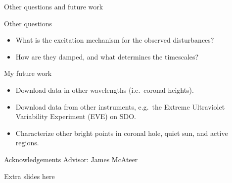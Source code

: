 \documentclass[11pt,table]{beamer}
\begin{document}
\begin{frame}{Other questions and future work}
    \begin{block}{Other questions}
        \begin{itemize}
            \item What is the excitation mechanism for the observed
                disturbances?
            \item How are they damped, and what determines the timescales?
        \end{itemize}
    \end{block}
    \begin{block}{My future work}
        \begin{itemize}
            \item Download data in other wavelengths (i.e.\ coronal heights).
            \item Download data from other instruments,
                e.g.\ the Extreme Ultraviolet Variability Experiment
                (EVE) on SDO\@.
            \item Characterize other bright points in coronal hole,
                quiet sun, and active regions.
        \end{itemize}
    \end{block}
\end{frame}%
\begin{frame}{Acknowledgements}
    Advisor: James McAteer
\end{frame}%

\begin{frame}{Extra slides here}
\end{frame}
\end{document}
